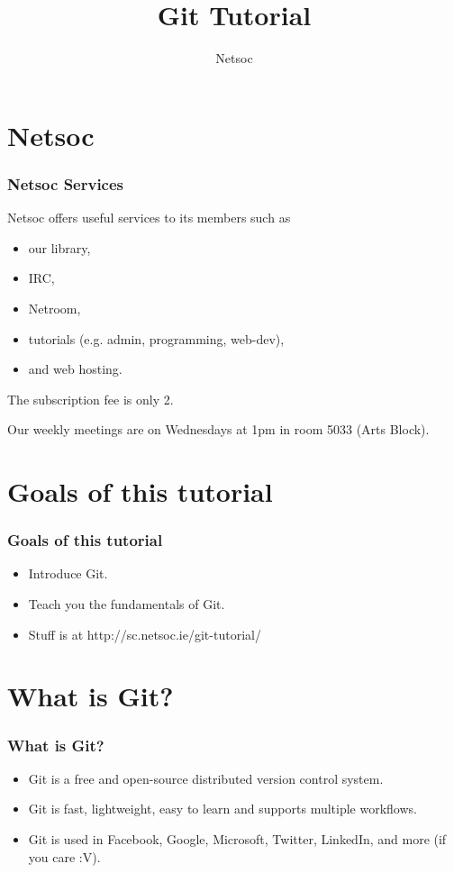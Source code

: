 \documentclass{beamer}
\title{Git Tutorial}
\author{Netsoc}
\date{}
\begin{document}
\frame{\titlepage}


\section{Netsoc}
\begin{frame}
\frametitle{Netsoc Services}
Netsoc offers useful services to its members such as
\begin{itemize}
	\pause
	\item our library,
	\pause
	\item IRC,
	\pause
	\item Netroom,
	\pause
	\item tutorials (e.g. admin, programming, web-dev),
	\pause
	\item and web hosting.
\end{itemize}
\pause

The subscription fee is only \EUR{}2.

\pause

Our weekly meetings are on Wednesdays at 1pm in room 5033 (Arts Block).
\end{frame}


\section{Goals of this tutorial}
\begin{frame}
\frametitle{Goals of this tutorial}
\begin{itemize}
\pause
\item Introduce Git.
\pause
\item Teach you the fundamentals of Git.
\pause
\item Stuff is at http://sc.netsoc.ie/git-tutorial/
\end{itemize}
\end{frame}


\section{What is Git?}
\begin{frame}
\frametitle{What is Git?}
\begin{itemize}
\pause
\item Git is a free and open-source distributed version control system.
\pause
\item Git is fast, lightweight, easy to learn and supports multiple workflows.
\pause
\item Git is used in Facebook, Google, Microsoft, Twitter, LinkedIn, and more
(if you care :V).
\end{itemize}
\end{frame}
\end{document}
